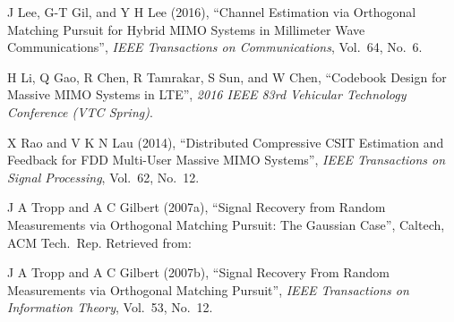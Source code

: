 \item J Lee, G-T Gil, and Y H Lee (2016), ``Channel Estimation via Orthogonal Matching Pursuit for Hybrid MIMO Systems in Millimeter Wave Communications'', {\it IEEE Transactions on Communications}, Vol.\ 64, No.\ 6.

\item H Li, Q Gao, R Chen, R Tamrakar, S Sun, and W Chen, ``Codebook Design for Massive MIMO Systems in LTE'', {\it 2016 IEEE 83rd Vehicular Technology Conference (VTC Spring)}.

\item X Rao and V K N Lau (2014), ``Distributed Compressive CSIT Estimation and Feedback for FDD Multi-User Massive MIMO Systems'', {\it IEEE Transactions on Signal Processing}, Vol.\ 62, No.\ 12.

\item J A Tropp and A C Gilbert (2007a), ``Signal Recovery from Random Measurements via Orthogonal Matching Pursuit: The Gaussian Case'', Caltech, ACM Tech.\ Rep. Retrieved from: 

\item J A Tropp and A C Gilbert (2007b), ``Signal Recovery From Random Measurements via Orthogonal Matching Pursuit'', {\it IEEE Transactions on Information Theory}, Vol.\ 53, No.\ 12.

\stopitemize

\stoptitle

